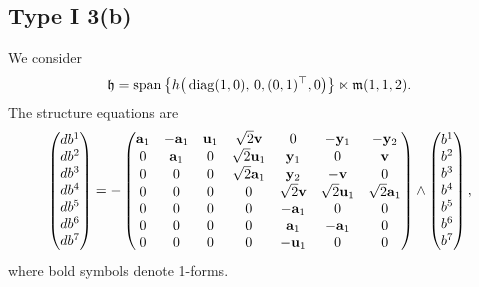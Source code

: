 \documentclass[pdftex]{sigma}
\numberwithin{equation}{section}
\newcommand\fh{{\frak h}}
\newcommand\fm{{\frak m}}
\newcommand\by{{\mathbf y}}
\newcommand{\Span}{\operatorname{span}}
\newcommand{\diag}{\operatorname{diag}}
\begin{document}
\subsection{Type I 3(b)}
We consider
\begin{gather*}\fh=\Span\big\{ h\big(\diag(1,0),\, 0,(0,1)^\top,0\big) \big\}\ltimes\fm(1,1,2).\end{gather*}
The structure equations are
\begin{gather}\label{EI3(b)}\left(\begin{matrix} db^1\\db^2\\db^3\\db^4\\db^5\\db^6\\db^7\end{matrix}\right) = -\left(
\begin{matrix}
{\bf a}_1&- {\bf a}_1&{\bf u}_1&\sqrt{2} {\bf v}&0&-\by_1&-\by_2\\
0&{\bf a}_1&0&\sqrt{2} {\bf u}_1&\by_1&0&{\bf v}\\
0&0&0& \sqrt{2} {\bf a}_1&\by_2&-{\bf v}&0\\
0&0&0&0&\sqrt{2} {\bf v}&\sqrt{2} {\bf u}_1&\sqrt 2 {\bf a}_1\\
0&0&0&0&-{\bf a}_1&0&0\\
0&0&0&0&{\bf a}_1&-{\bf a}_1&0\\
0&0&0&0&-{\bf u}_1&0&0
\end{matrix}\right) \wedge \left(\begin{matrix} b^1\\b^2\\b^3\\b^4\\b^5\\b^6\\b^7\end{matrix}\right),
\end{gather}
where bold symbols denote 1-forms.
\end{document}
